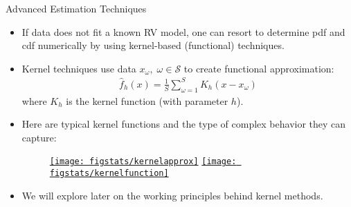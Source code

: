 \documentclass[9pt]{beamer}
\begin{document}
%
\begin{frame}{Advanced Estimation Techniques}

\begin{itemize}
\setlength{\itemsep}{10pt}
\item If data does not fit a known RV model, one can resort to determine pdf and cdf numerically by using kernel-based (functional) techniques. 

\item Kernel techniques use data $x_\omega,\; \omega \in \mathcal{S}$ to create functional approximation:
\begin{align*}
\hat{f}_h(x) = \frac{1}{S}\sum_{\omega=1}^S K_h (x - x_\omega) 
\end{align*}
where $K_h$ is the kernel function (with parameter $h$). 
\item Here are typical kernel functions and the type of complex behavior they can capture:
\begin{figure}[!htb]
    \centering
	\href{https://en.wikipedia.org/wiki/Kernel_(statistics)}{\texttt{[image: figstats/kernelapprox]}}
	\href{https://en.wikipedia.org/wiki/Kernel_(statistics)}{\texttt{[image: figstats/kernelfunction]}}
\end{figure}
\item We will explore later on the working principles behind kernel methods. 

\end{itemize}


\end{frame}
\end{document}
